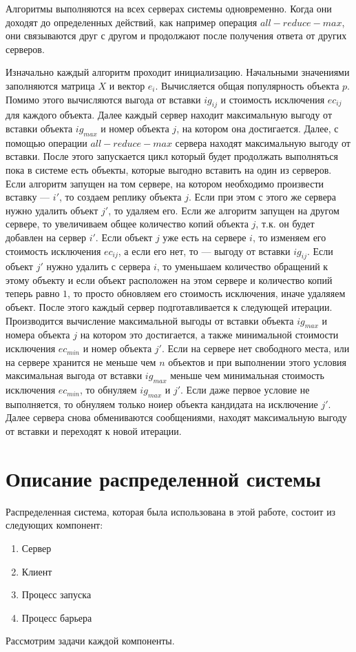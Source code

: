 			\newpage
			Алгоритмы выполняются на всех серверах системы одновременно. Когда они доходят до определенных действий, 
			как например операция $all-reduce-max$, они связываются друг с другом и продолжают после получения ответа 
			от других серверов.

			Изначально каждый алгоритм проходит инициализацию. Начальными значениями заполняются матрица $X$ и вектор $e_i$.
			Вычисляется общая популярность объекта $p$. Помимо этого вычисляются выгода от вставки $ig_{ij}$ и стоимость 
			исключения $ec_{ij}$ для каждого объекта. Далее каждый сервер находит максимальную выгоду от вставки объекта $ig_{max}$ и 
			номер объекта $j$, на котором она достигается. Далее, с помощью операции $all-reduce-max$ сервера находят максимальную 
			выгоду от вставки. После этого запускается цикл который будет продолжать выполняться пока в системе есть объекты, 
			которые выгодно вставить на один из серверов. Если алгоритм запущен на том сервере, на котором необходимо произвести 
			вставку --- $i'$, то создаем реплику объекта $j$. Если при этом с этого же сервера нужно удалить объект $j'$, то 
			удаляем его. Если же алгоритм запущен на другом сервере, то увеличиваем общее количество копий объекта $j$, т.к. он
			будет добавлен на сервер $i'$. Если объект $j$ уже есть на сервере $i$, то изменяем его стоимость исключения $ec_{ij}$,
			а если его нет, то --- выгоду от вставки $ig_{ij}$. Если объект $j'$ нужно удалить с сервера $i$, то уменьшаем количество 
			обращений к этому объекту и если объект расположен на этом сервере и количество копий теперь равно $1$, то просто обновляем
			его стоимость исключения, иначе удаляяем объект. После этого каждый сервер подготавливается к следующей итерации.
			Производится вычисление максимальной выгоды от вставки объекта $ig_{max}$ и номера объекта $j$ на котором это достигается, а также 
			минимальной стоимости исключения $ec_{min}$ и номер объекта $j'$. Если на сервере нет свободного места, или на сервере хранится 
			не меньше чем $n$ объектов и при выполнении этого условия максимальная выгода от вставки $ig_{max}$ меньше чем минимальная стоимость 
			исключения $ec_{min}$, то обнуляем $ig_{max}$ и $j'$. Если даже первое условие не выполняется, то обнуляем только ноиер объекта 
			кандидата на исключение $j'$. Далее сервера снова обмениваются сообщениями, находят максимальную выгоду от вставки и
			переходят к новой итерации.
\newpage

\chapter{Описание распределенной системы}
	Распределенная система, которая была использована в этой работе, состоит из следующих компонент:
	\begin{enumerate}
		\item Сервер
		\item Клиент
		\item Процесс запуска
		\item Процесс барьера
	\end{enumerate}
	Рассмотрим задачи каждой компоненты.

